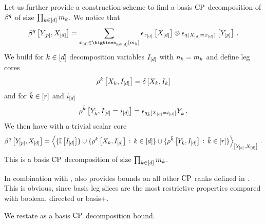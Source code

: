 Let us further provide a construction scheme to find a basis $\mathrm{CP}$ decomposition of $\beta^{q}$ of size $\prod_{k\in[d]}m_{k}$.
We notice that
\begin{align*}
    \bencodingofat{\exfunction}{\secshortcatvariables,\shortcatvariables}
    = \sum_{\shortcatindices\in\facstates} \onehotmapofat{\shortcatindices}{\shortcatvariables} \otimes \onehotmapofat{\exfunctionat{\indexedshortcatvariables}}{\secshortcatvariables} \, .
\end{align*}
We build for $k\in[d]$ decomposition variables $I_{[d]}$ with $n_{k}=m_{k}$ and define leg cores %
\begin{align*}
    \rho^{k}\left[X_{k},I_{[d]}\right] = \delta\left[X_{k},I_{k}\right]
\end{align*}
and for $\tilde{k}\in[r]$ and $i_{[d]}$
\begin{align*}
    \rho^{\tilde{k}}\left[Y_{\tilde{k}},I_{[d]}=i_{[d]}\right]
    = \epsilon_{q_{\tilde{k}}[X_{[d]}=i_{[d]}]}{Y_{\tilde{k}}} \, .
\end{align*}
We then have with a trivial scalar core
\begin{align*}
    \bencodingofat{\exfunction}{\secshortcatvariables,\shortcatvariables}
    = \contractionof{
        \{\onesat{\decvariableof{[\atomorder]}}\}\cup
        \{\legcoreofat{\catenumerator}{\catvariableof{\atomenumerator},\decvariableof{[\atomorder]}} \wcols \catenumeratorin\} \cup
        \{\legcoreofat{\seccatenumerator}{\seccatvariableof{\seccatenumerator},\decvariableof{[\atomorder]}} \wcols \seccatenumerator\in[\secatomorder]\}
    }{\secshortcatvariables,\shortcatvariables} \, .
\end{align*}
This is a basis $\mathrm{CP}$ decomposition of size $\prod_{k\in[d]}m_{k}$.

In combination with ,  also provides bounds on all other $\mathrm{CP}$ ranks defined in .
This is obvious, since basis leg slices are the most restrictive properties compared with boolean, directed or basis+.


We restate  as a basis $\mathrm{CP}$ decomposition bound.

